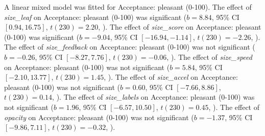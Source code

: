 A linear mixed model was fitted for Acceptance: pleasant (0-100).
The effect of \textit{size\_leaf} on Acceptance: pleasant (0-100) was significant ($b = 8.84$, 95\% CI $[0.94, 16.75]$, $t(230) = 2.20$, ).
The effect of \textit{size\_score} on Acceptance: pleasant (0-100) was significant ($b = -9.04$, 95\% CI $[-16.94, -1.14]$, $t(230) = -2.26$, ).
The effect of \textit{size\_feedback} on Acceptance: pleasant (0-100) was not significant ($b = -0.26$, 95\% CI $[-8.27, 7.76]$, $t(230) = -0.06$, ).
The effect of \textit{size\_speed} on Acceptance: pleasant (0-100) was not significant ($b = 5.84$, 95\% CI $[-2.10, 13.77]$, $t(230) = 1.45$, ).
The effect of \textit{size\_accel} on Acceptance: pleasant (0-100) was not significant ($b = 0.60$, 95\% CI $[-7.66, 8.86]$, $t(230) = 0.14$, ).
The effect of \textit{size\_labels} on Acceptance: pleasant (0-100) was not significant ($b = 1.96$, 95\% CI $[-6.57, 10.50]$, $t(230) = 0.45$, ).
The effect of \textit{opacity} on Acceptance: pleasant (0-100) was not significant ($b = -1.37$, 95\% CI $[-9.86, 7.11]$, $t(230) = -0.32$, ).
